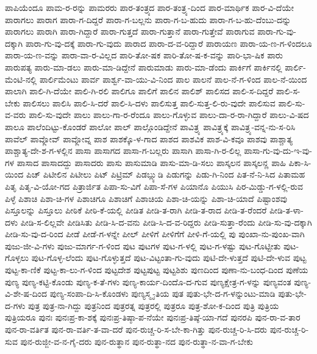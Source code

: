 {ಪಾಪಿಯೆಂದೂ
ಪಾಮ-ರ-ರನ್ನು
ಪಾಮರರು
ಪಾರ-ತಂತ್ರ್ಯದ
ಪಾರ-ತಂತ್ರ್ಯ-ದಿಂದ
ಪಾರ-ಮಾರ್ಥಿಕ
ಪಾರ-ವಿ-ದೆಯೇ
ಪಾರಾಗಲು
ಪಾರಾಗ
ಪಾರಾ-ಗ-ದಿದ್ದರೆ
ಪಾರಾ-ಗ-ಬಲ್ಲನು
ಪಾರಾ-ಗ-ಬ-ಹುದು
ಪಾರಾ-ಗ-ಬ-ಹು-ದೆಂಬು-ದನ್ನು
ಪಾರಾಗಲು
ಪಾರಾಗಿ
ಪಾರಾ-ಗಿದ್ದಾರೆ
ಪಾರಾ-ಗುತ್ತದೆ
ಪಾರಾ-ಗುತ್ತಾನೆ
ಪಾರಾ-ಗುತ್ತೇವೆ
ಪಾರಾಗುವ
ಪಾರಾ-ಗು-ವು-ದಕ್ಕಾಗಿ
ಪಾರಾ-ಗು-ವು-ದಕ್ಕೆ
ಪಾರಾ-ಗು-ವುದು
ಪಾರಾದ
ಪಾರಾ-ದ-ವ-ರಿದ್ದಾರೆ
ಪಾರಾಯಣ
ಪಾರಾ-ಯ-ಣ-ಗ-ಳಿಂದಲೂ
ಪಾರಾ-ಯ-ಣ-ವನ್ನು
ಪಾರಾ-ವಾ-ರ-ವಿಲ್ಲದ
ಪಾರಿ-ತೋ-ಷಕ
ಪಾರಿ-ತೋ-ಷ-ಕ-ವನ್ನು
ಪಾರಿ-ಭಾ-ಷಿಕ
ಪಾರು
ಪಾರುಪತ್ಯ
ಪಾರು-ಮಾ-ಡಲು
ಪಾರು-ಮಾ-ಡಿದ್ದೇನೆ
ಪಾರುಮಾಡು
ಪಾರು-ಮಾ-ಡೆಂದು
ಪಾರ್ಕಿಗೆ
ಪಾರ್ಕಿನಲ್ಲಿ
ಪಾರ್ಲಿ-ಮೆಂಟಿ-ನಲ್ಲಿ
ಪಾರ್ಲಿಮೆಂಟು
ಪಾರ್ವ
ಪಾರ್ಶ್ವ-ವಾ-ಯು-ವಿ-ನಿಂದ
ಪಾಲ
ಪಾಲನೆ
ಪಾಲ-ನೆ-ಗ-ಳಿಂದ
ಪಾಲ-ನೆ-ಯಿಂದ
ಪಾಲಾಗಿ
ಪಾಲಿ-ಗಿ-ದೆಯೇ
ಪಾಲಿ-ಗಿ-ರಲಿ
ಪಾಲಿಗೂ
ಪಾಲಿಗೆ
ಪಾಲಿನ
ಪಾಲಿಶ್
ಪಾಲಿಸದ
ಪಾಲಿ-ಸ-ದಿದ್ದರೆ
ಪಾಲಿ-ಸ-ಬೇಕು
ಪಾಲಿಸಲು
ಪಾಲಿಸಿ
ಪಾಲಿ-ಸಿ-ದರೆ
ಪಾಲಿ-ಸಿ-ದಳು
ಪಾಲಿಸುತ್ತ
ಪಾಲಿ-ಸುತ್ತ-ಲಿ-ರು-ವುದೇ
ಪಾಲಿಸುವ
ಪಾಲಿ-ಸು-ವ-ವರು
ಪಾಲಿ-ಸು-ವುದೇ
ಪಾಲು
ಪಾಲು-ಗಾ-ರ-ರೆಂದೂ
ಪಾಲು-ಗೊಳ್ಳುವ
ಪಾಲು-ದಾ-ರ-ರಾ-ಗಿದ್ದಾರೆ
ಪಾಲು-ವಿ-ಷದ
ಪಾಲೂ
ಪಾಲೆಂದಿಟ್ಟು-ಕೊಂಡರೆ
ಪಾಲೋ
ಪಾಲ್
ಪಾಲ್ಗೊಂಡಿದ್ದೇನೆ
ಪಾವಿತ್ರ್ಯ
ಪಾವಿತ್ರ್ಯಕ್ಕೆ
ಪಾವಿತ್ರ್ಯ-ವನ್ನ-ನು-ಸ-ರಿಸಿ
ಪಾವೆಲ್
ಪಾವ್ಲೋವ್
ಪಾವ್ಲೋವ್ನ
ಪಾಶ
ಪಾಶಕ್ಕೊ-ಳ-ಗಾದ
ಪಾಶದ
ಪಾಶವಿಕ
ಪಾಶ-ವಿ-ಕವೂ
ಪಾಶವು
ಪಾಶ್ಚಾತ್ಯ
ಪಾಶ್ಚಾತ್ಯ-ದೇ-ಶ-ಗ-ಳಲ್ಲಿನ
ಪಾಸಾ
ಪಾಸಾಗದ
ಪಾಸಾ-ಗ-ಬಲ್ಲರು
ಪಾಸಾಗಿ
ಪಾಸಾ-ಗಿ-ರ-ಲಿಲ್ಲ
ಪಾಸಾ-ಗು-ವು-ದು-ಇ-ವು-ಗಳ
ಪಾಸಾದ
ಪಾಸಾದದ್ದು
ಪಾಸಾದರು
ಪಾಸು
ಪಾಸುಮಾಡಿ
ಪಾಸು-ಮಾ-ಡಿ-ಸಲು
ಪಾಸ್ಕಲನ
ಪಾಸ್ಕಲನ್ಣ
ಪಾಹಿ
ಪಿಕಾ-ಸಿ-ಯಿಂದ
ಪಿಚ್
ಪಿಟೀಲಿನ
ಪಿಟೀಲು
ಪಿಟ್
ಪಿಟ್ರಿಮ್
ಪಿಡಬ್ಲ್ಯುಡಿ
ಪಿಡುಗನ್ನು
ಪಿಡು-ಗಿ-ನಿಂದ
ಪಿತ-ನೆ-ನಿ-ಸಿದ
ಪಿತಾಮಹ
ಪಿತೃ
ಪಿತೃ-ವಿ-ಯೋ-ಗದ
ಪಿತ್ರಾರ್ಜಿತ
ಪಿಪಾ-ಸು-ವಿಗೆ
ಪಿಪಾ-ಸೆ-ಗಳ
ಪಿಯಾನೊ
ಪಿಯುಸಿ
ಪಿರ-ಮಿಡ್ಡು-ಗ-ಳಲ್ಲಿ-ರುವ
ಪಿಳ್ಳೆ
ಪಿಶಾಚಿ
ಪಿಶಾ-ಚಿ-ಗಳ
ಪಿಶಾಚಿಗೂ
ಪಿಶಾಚಿಗೆ
ಪಿಶಾಚಿಯ
ಪಿಶಾ-ಚಿ-ಯನ್ನು
ಪಿಶಾ-ಚಿ-ಯಾದೆ
ಪಿಷ್ಟಾಂಶವು
ಪಿಸ್ತೂಲನ್ನು
ಪಿಸ್ತೂಲು
ಪೀಠಿಕೆ
ಪೀಠಿ-ಕೆ-ಯಲ್ಲಿ
ಪೀಡಿತ
ಪೀಡಿ-ತ-ರಾಗಿ
ಪೀಡಿ-ತ-ರಾದ
ಪೀಡಿ-ತ-ರೆಂದರೆ
ಪೀಡಿ-ತ-ಳಾ-ದಳು
ಪೀಡಿ-ಸ-ಲಿಲ್ಲವೇ
ಪೀಡಿಸಿತು
ಪೀಡಿ-ಸಿ-ದ-ವನು
ಪೀಡಿ-ಸಿ-ದ-ವ-ರಿದ್ದರು
ಪೀಡಿ-ಸುತ್ತಾ-ರೆಂದು
ಪೀಡಿ-ಸು-ವು-ದಕ್ಕಾಗಿ
ಪೀಡಿ-ಸು-ವು-ದ-ರಿಂದ
ಪೀಡೆ
ಪೀಡೆ-ಗ-ಳನ್ನೇ
ಪೀಲ್
ಪೀಳಿಗೆ
ಪೀಳಿಗೆಗೆ
ಪೀಳಿ-ಗೆ-ಯಲ್ಲಿ
ಪು
ಪುಂಖಾ-ನು-ಪುಂಖ-ವಾಗಿ
ಪುಜು-ಜೀ-ವಿ-ಗಳು
ಪುಜು-ಮಾರ್ಗ-ಗ-ಳಿಂದ
ಪುಟ
ಪುಟಗಳ
ಪುಟ-ಗ-ಳಲ್ಲಿ
ಪುಟ-ಗ-ಳಷ್ಟು
ಪುಟ-ಗೊಟ್ಟೀತು
ಪುಟ-ಗೊಳ್ಳಲು
ಪುಟ-ಗೊಳ್ಳ-ಲೆಂದು
ಪುಟ-ಗೊಳ್ಳುತ್ತದೆ
ಪುಟ-ವಿಟ್ಟಂತಾ-ಗು-ವುದು
ಪುಟಿ-ದೇ-ಳುತ್ತದೆ
ಪುಟಿ-ದೇ-ಳುವ
ಪುಟ್ಟ
ಪುಟ್ಟ-ಕಾ-ಣಿಕೆ
ಪುಟ್ಟ-ಕಾ-ಲು-ಗ-ಳಿಂದ
ಪುಟ್ಟದೇಶ
ಪುಟ್ಟಪುಟ್ಟ
ಪುಟ್ಟಶಿಶು
ಪುಣದಿಂದ
ಪುಣಾ-ನು-ಬಂಧ-ದಿಂದ
ಪುಣೆಯ
ಪುಣ್ಯ
ಪುಣ್ಯ-ಕಟ್ಟಿ-ಕೊಂಡು
ಪುಣ್ಯ-ಕ-ತೆ-ಗಳು
ಪುಣ್ಯ-ಕಾರ್ಯ-ದಿಂದೊ-ದ-ಗುವ
ಪುಣ್ಯಕ್ಷೇತ್ರ-ಗ-ಳನ್ನು
ಪುಣ್ಯವಂತ
ಪುಣ್ಯ-ವಿ-ಶೇ-ಷ-ದಿಂದ
ಪುಣ್ಯ-ಸಂಪಾ-ದಿ-ಸಿ-ಕೊಂಡಳು
ಪುಣ್ಯಸ್ಮೃ-ತಿಯ
ಪುತ
ಪುತು-ಭೇ-ದ-ಗ-ಳನ್ನುಂಟು-ಮಾಡಿ
ಪುತು-ಭೇ-ದ-ಗಳು
ಪುತ್ರ
ಪುತ್ರ-ನಾ-ಗಿದ್ದು
ಪುತ್ರನಿಂದ
ಪುತ್ರರತ್ನ
ಪುತ್ರರಲ್ಲಿ
ಪುತ್ರರೂ
ಪುತ್ರ-ಶೋ-ಕ-ದಿಂದ
ಪುತ್ರಿ
ಪುತ್ರಿಯ
ಪುತ್ರಿಯರೂ
ಪುನಃ
ಪುನಃಪ್ರ-ಕಾ-ಶಕ್ಕೆ
ಪುನಃಪ್ರ-ತಿಷ್ಠಾ-ಪ-ನೆಯೇ
ಪುನಃಪ್ರ-ತಿಷ್ಠೆ-ಯಾ-ಗದೆ
ಪುನರಪಿ
ಪುನ-ರಾ-ವ-ತಾರ
ಪುನ-ರಾ-ವರ್ತಿತ
ಪುನ-ರಾ-ವರ್ತಿ-ತ-ವಾ-ದರೆ
ಪುನ-ರುಚ್ಚ-ರಿ-ಸ-ಬೇ-ಕಾ-ಗಿತ್ತು
ಪುನ-ರುಚ್ಚ-ರಿ-ಸಿ-ದರು
ಪುನ-ರುಚ್ಚ-ರಿ-ಸುವ
ಪುನ-ರುಜ್ಜೀ-ವ-ನ-ಗೈ-ದರು
ಪುನ-ರುತ್ಥಾನ
ಪುನ-ರುತ್ಥಾ-ನದ
ಪುನ-ರುತ್ಥಾ-ನ-ವಾ-ಗ-ಬೇಕು
}
